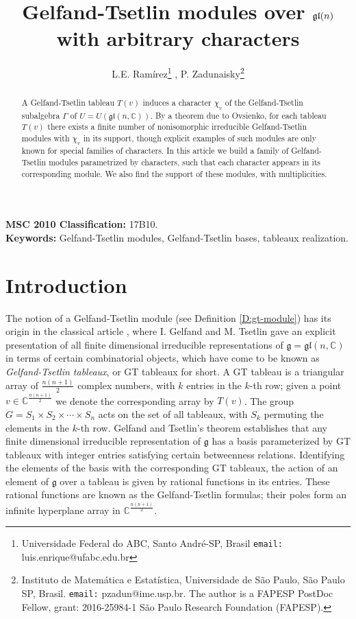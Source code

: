\documentclass[11pt,fleqn]{article}
\title{Gelfand-Tsetlin modules over $\gl(n)$ with arbitrary characters}
\author{L.E. Ram\'irez\footnote{Universidade Federal do ABC, Santo Andr\'e-SP, 
Brasil \texttt{email:} luis.enrique@ufabc.edu.br} , 
P. Zadunaisky\footnote{Instituto de Matem\'atica e Estat\'istica, Universidade 
de S\~ao Paulo,  S\~ao Paulo SP, Brasil. \texttt{email:} pzadun@ime.usp.br.
The author is a FAPESP PostDoc Fellow, grant: 2016-25984-1 
S\~ao Paulo Research Foundation (FAPESP).}
}
\date{}
\newcommand\CC{\mathbb C}
\newcommand\g{\mathfrak g}
\newcommand\gl{\mathfrak{gl}}
\begin{document}
\maketitle

\begin{abstract}
A Gelfand-Tsetlin tableau $T(v)$ induces a character $\chi_v$ of the 
Gelfand-Tsetlin subalgebra $\Gamma$ of $U = U(\gl(n,\CC))$. By a theorem due 
to Ovsienko, for each tableau $T(v)$ there exists a finite number of 
nonisomorphic irreducible Gelfand-Tsetlin modules with $\chi_v$ in its 
support, though explicit examples of such modules are only known for special
families of characters. In this article we build a family of Gelfand-Tsetlin
modules parametrized by characters, such that each character appears in its
corresponding module. We also find the support of these modules, with 
multiplicities.
\end{abstract}
\noindent\textbf{MSC 2010 Classification:} 17B10.\\
\noindent\textbf{Keywords:} Gelfand-Tsetlin modules, Gelfand-Tsetlin bases,
tableaux realization.

\section{Introduction}
The notion of a Gelfand-Tsetlin module (see Definition \ref{D:gt-module}) has 
its origin in the classical article \cite{GT-modules}, where I. Gelfand and M. 
Tsetlin gave an explicit presentation of all finite dimensional irreducible 
representations of $\g = \gl(n,\CC)$ in terms of certain combinatorial 
objects, which have come to be known as \emph{Gelfand-Tsetlin tableaux}, or 
GT tableaux for short. A GT tableau is a triangular array of $\frac{n(n+1)}{2}$
complex numbers, with $k$ entries in the $k$-th row; given a point $v \in 
\CC^{\frac{n(n+1)}{2}}$ we denote the corresponding array by $T(v)$. The group 
$G = S_1 \times S_2 \times \cdots \times S_n$ acts on the set of all tableaux, 
with $S_k$ permuting the elements in the $k$-th row. Gelfand and Tsetlin's
theorem establishes that any finite dimensional irreducible representation of 
$\g$ has a basis parameterized by GT tableaux with integer entries satisfying 
certain betweenness relations. Identifying the elements of the basis with the 
corresponding GT tableaux, the action of an element of $\g$ over a 
tableau is given by rational functions in its entries. These rational 
functions are known as the Gelfand-Tsetlin formulas; their poles form an 
infinite hyperplane array in $\CC^{\frac{n(n+1)}{2}}$.
\end{document}
